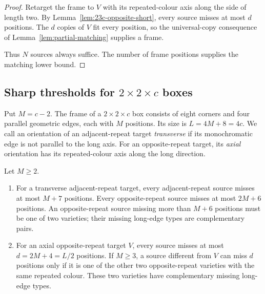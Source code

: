 \begin{proof}
Retarget the frame to $V$ with its repeated-colour axis along the side
of length two. By Lemma~\ref{lem:23c-opposite-short}, every source misses
at most $d$ positions. The $d$ copies of $V$ fit every position, so the universal-copy consequence
of Lemma~\ref{lem:partial-matching} supplies a frame.

Thus $N$ sources always suffice. The number of frame positions supplies
the matching lower bound.
\end{proof}

\subsection[Sharp thresholds for 2 by 2 by c boxes]{Sharp thresholds for $2\times2\times c$ boxes}

Put $M=c-2$. The frame of a $2\times2\times c$ box consists of eight
corners and four parallel geometric edges, each with $M$ positions. Its
size is $L=4M+8=4c$. We call an orientation of an adjacent-repeat target
\emph{transverse} if its monochromatic edge is not parallel to the long
axis. For an opposite-repeat target, its \emph{axial} orientation has
its repeated-colour axis along the long direction.

\begin{lemma}\label{lem:rod-compatibility}
Let $M\ge2$.
\begin{enumerate}
\item For a transverse adjacent-repeat target, every adjacent-repeat
source misses at most $M+7$ positions. Every opposite-repeat source
misses at most $2M+6$ positions. An opposite-repeat source missing more
than $M+6$ positions must be one of two varieties; their missing
long-edge types are complementary pairs.
\item For an axial opposite-repeat target $V$, every source misses at
most $d=2M+4=L/2$ positions. If $M\ge3$, a source different from $V$
can miss $d$ positions only if it is one of the other two opposite-repeat
varieties with the same repeated colour. These two varieties have
complementary missing long-edge types.
\end{enumerate}
\end{lemma}

